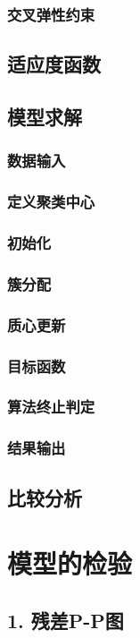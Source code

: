 \documentclass[12pt]{ctexart}
\begin{document}
	\subsubsection{交叉弹性约束}
	\subsection{适应度函数}
	\subsection{模型求解}
	\subsubsection{数据输入}
	\subsubsection{定义聚类中心}
	\subsubsection{初始化}
	\subsubsection{簇分配}
	\subsubsection{质心更新}
	\subsubsection{目标函数}
	\subsubsection{算法终止判定}
	\subsubsection{结果输出}
	\subsection{比较分析}
	
	\newpage
	\section{模型的检验}
	\subsection*{1. 残差P-P图}
\end{document}
